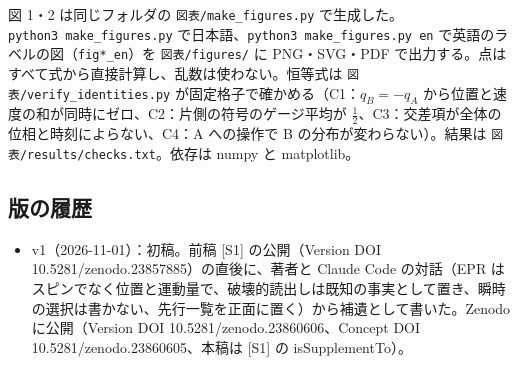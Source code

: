 \documentclass[
  a4paper,
]{ltjsarticle}
\providecommand{\tightlist}{%
  \setlength{\itemsep}{0pt}\setlength{\parskip}{0pt}}
\begin{document}
図 1・2 は同じフォルダの \texttt{図表/\allowbreak{}make\_\allowbreak{}figures.py}
で生成した。\texttt{python3\ make\_\allowbreak{}figures.py}
で日本語、\texttt{python3\ make\_\allowbreak{}figures.py\ en}
で英語のラベルの図（\texttt{fig*\_\allowbreak{}en}）を \texttt{図表/\allowbreak{}figures/\allowbreak{}} に
PNG・SVG・PDF
で出力する。点はすべて式から直接計算し、乱数は使わない。恒等式は
\texttt{図表/\allowbreak{}verify\_\allowbreak{}identities.py}
が固定格子で確かめる（C1：\(q_B=-q_A\)
から位置と速度の和が同時にゼロ、C2：片側の符号のゲージ平均が
\(\tfrac12\)、C3：交差項が全体の位相と時刻によらない、C4：A への操作で B
の分布が変わらない）。結果は \texttt{図表/\allowbreak{}results/\allowbreak{}checks.txt}。依存は
numpy と matplotlib。

\subsection{版の履歴}\label{ux7248ux306eux5c65ux6b74}

\begin{itemize}
\tightlist
\item
  v1（2026-11-01）：初稿。前稿 {[}S1{]} の公開（Version DOI
  10.5281/zenodo.23857885）の直後に、著者と Claude Code の対話（EPR
  はスピンでなく位置と運動量で、破壊的読出しは既知の事実として置き、瞬時の選択は書かない、先行一覧を正面に置く）から補遺として書いた。Zenodo
  に公開（Version DOI 10.5281/zenodo.23860606、Concept DOI
  10.5281/zenodo.23860605、本稿は {[}S1{]} の isSupplementTo）。
\end{itemize}
\end{document}
